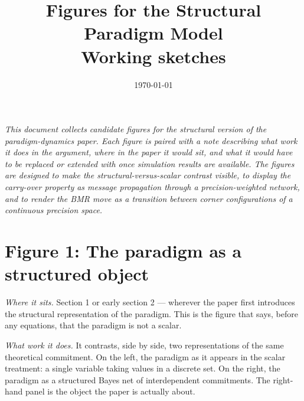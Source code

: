 \documentclass[11pt]{article}
\title{Figures for the Structural Paradigm Model\\[0.2em]\large Working sketches}
\author{}
\date{\today}
\begin{document}
\maketitle

\noindent\textit{\textcolor{notegrey}{This document collects candidate figures for the structural version of the paradigm-dynamics paper. Each figure is paired with a note describing what work it does in the argument, where in the paper it would sit, and what it would have to be replaced or extended with once simulation results are available. The figures are designed to make the structural-versus-scalar contrast visible, to display the carry-over property as message propagation through a precision-weighted network, and to render the BMR move as a transition between corner configurations of a continuous precision space.}}

\section*{Figure 1: The paradigm as a structured object}

\textit{Where it sits.} Section 1 or early section 2 — wherever the paper first introduces the structural representation of the paradigm. This is the figure that says, before any equations, that the paradigm is not a scalar.

\textit{What work it does.} It contrasts, side by side, two representations of the same theoretical commitment. On the left, the paradigm as it appears in the scalar treatment: a single variable taking values in a discrete set. On the right, the paradigm as a structured Bayes net of interdependent commitments. The right-hand panel is the object the paper is actually about.
\end{document}

